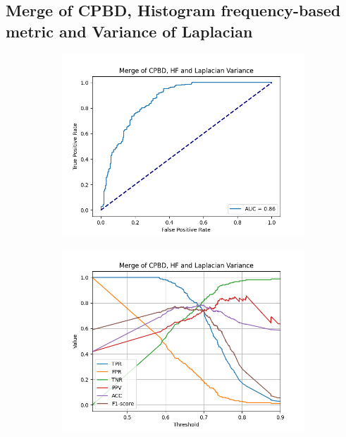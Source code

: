 \subsection{Merge of CPBD, Histogram frequency-based metric and Variance of Laplacian}
\begin{figure}[H]
    \centering
    \begin{subfigure}[t]{0.48\textwidth}
        \includegraphics[width=\textwidth]{Figures/results_on_thresholds/output_roc_cpbd_hf_lv.png}
        \caption{}
        \label{fig:CPBD_HF_LV_roc}
    \end{subfigure}\hspace{1em}
    \begin{subfigure}[t]{0.48\textwidth}
        \includegraphics[width=\textwidth]{Figures/results_on_thresholds/threshold_test_scores_cpbd_hf_lv.png}

\end{subfigure}
\end{figure}
